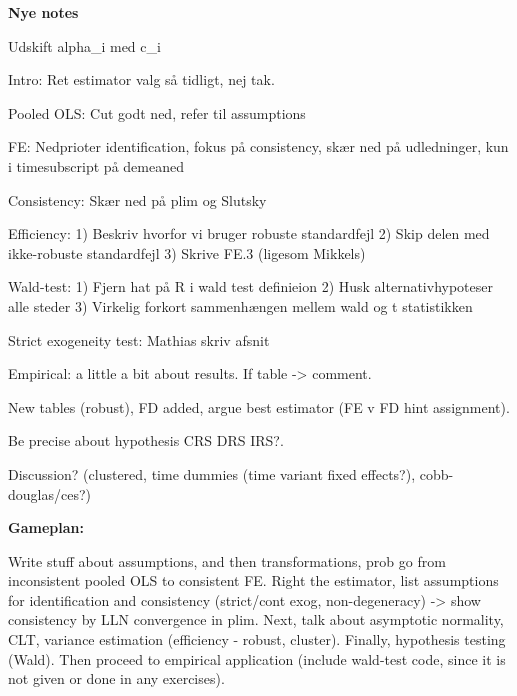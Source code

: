 \textbf{Nye notes}

Udskift alpha_i med c_i

Intro: Ret estimator valg så tidligt, nej tak. 

Pooled OLS: Cut godt ned, refer til assumptions

FE: Nedprioter identification, fokus på consistency, skær ned på udledninger, kun i timesubscript på demeaned

Consistency: Skær ned på plim og Slutsky

Efficiency:
1) Beskriv hvorfor vi bruger robuste standardfejl
2) Skip delen med ikke-robuste standardfejl
3) Skrive FE.3 (ligesom Mikkels)

Wald-test:
1) Fjern hat på R i wald test definieion
2) Husk alternativhypoteser alle steder
3) Virkelig forkort sammenhængen mellem wald og t statistikken

Strict exogeneity test: Mathias skriv afsnit

Empirical: 
a little a bit about results. If table -> comment. 

New tables (robust), FD added, argue best estimator (FE v FD hint assignment). 

Be precise about hypothesis CRS DRS IRS?. 

Discussion? (clustered, time dummies (time variant fixed effects?), cobb-douglas/ces?) 

\textbf{Gameplan:}

Write stuff about assumptions, and then transformations, prob go from inconsistent pooled OLS to consistent FE. Right the estimator, list assumptions for identification and consistency (strict/cont exog, non-degeneracy) -> show consistency by LLN convergence in plim. Next, talk about asymptotic normality, CLT, variance estimation (efficiency - robust, cluster). Finally, hypothesis testing (Wald). Then proceed to empirical application (include wald-test code, since it is not given or done in any exercises).

